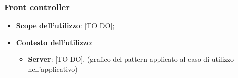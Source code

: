 	\subsubsection{Front controller} %
	\label{ssub:front_controller}
		\begin{itemize}
			\item \textbf{Scope dell'utilizzo}: [TO DO];
			\item \textbf{Contesto dell'utilizzo}:
				\begin{itemize}
					\item \textbf{Server}: [TO DO]. \newline
					[TO DO] (grafico del pattern applicato al caso di utilizzo nell'applicativo)
				\end{itemize}
		\end{itemize}



